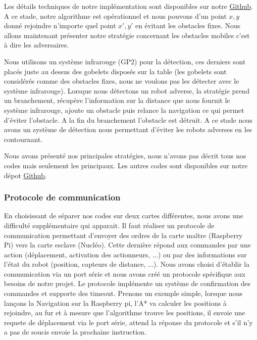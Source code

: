 \documentclass[a4paper,10pt]{article}
\begin{document}
\begin{spacing}{1.5}
Les détails techniques de notre implémentation sont disponibles sur notre
\href{https://github.com/eirbot/eirbot2020-1A/blob/master/code/rasp/src/navigation.cpp}{Github}.
A ce stade, notre algorithme est opérationnel et nous pouvons d'un point $x,y$
donné rejoindre n'importe quel point $x',y'$ en évitant les obstacles fixes.
Nous allons maintenant présenter notre stratégie concernant les obstacles
mobiles c'est à dire les adversaires.

Nous utilisons un système infrarouge (GP2) pour la détection, ces derniers sont
placés juste au dessus des gobelets disposés sur la table (les gobelets sont
considérés comme des obstacles fixes, nous ne voulons pas les détecter avec le
système infrarouge). Lorsque nous détectons un robot adverse, la stratégie prend
un branchement, récupère l'information sur la distance que nous fournit le
système infrarouge, ajoute un obstacle puis relance la navigation ce qui permet d'éviter l'obstacle.
A la fin du branchement l'obstacle est détruit. A ce stade nous avons un
système de détection nous permettant d'éviter les robots adverses en les
contournant.

Nous avons présenté nos principales stratégies, nous n'avons pas décrit tous
nos codes mais seulement les principaux. Les autres codes sont disponibles sur
notre dépot \href{https://github.com/eirbot/eirbot2020-1A}{Github}.

\subsubsection{Protocole de communication}
En choisissant de séparer nos codes sur deux cartes différentes, nous avons une
difficulté supplémentaire qui apparait. Il faut réaliser un protocole de
communication permettant d'envoyer des ordres de la carte maître (Raspberry
Pi) vers la carte esclave (Nucléo). Cette dernière répond aux commandes par une
action (déplacement, activation des actionneurs, ...) ou par des
informations sur l'état du robot (position, capteurs de distance, ...). Nous
avons choisi d'établir la communication via un port série et nous avons créé un
protocole spécifique aux besoins de notre projet. Le protocole implémente un
système de confirmation des commandes et supporte des timeout. Prenons un
exemple simple, lorsque nous lançons la Navigation sur la Raspberry pi, l'A* va
calculer les positions à rejoindre, au fur et à mesure que l'algorithme trouve
les positions, il envoie une requete de déplacement via le port série, attend la
réponse du protocole et s'il n'y a pas de soucis envoie la prochaine instruction.


\end{spacing}
\end{document}
